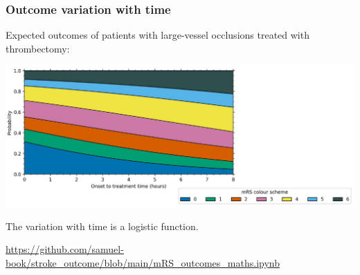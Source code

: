 \documentclass[xcolor={usenames,dvipsnames}]{beamer}
\newcommand{\smallurl}[1]{\textcolor{blue}{\fontsize{4pt}{4.8pt}\selectfont \url{#1}}}
\begin{document}

\begin{frame}
\frametitle{Outcome variation with time}

Expected outcomes of patients with large-vessel occlusions treated with thrombectomy: 

\begin{center} 
\includegraphics[width=\textwidth]{./images/probs_with_time_not_annotated}
\end{center} 




The variation with time is a logistic function. 
\phantom{If treated at time 3h30min, Patient X will see an improvement in mRS score of 1 c.}

\vspace{1em}
\smallurl{https://github.com/samuel-book/stroke_outcome/blob/main/mRS_outcomes_maths.ipynb}

\end{frame}


\end{document}
